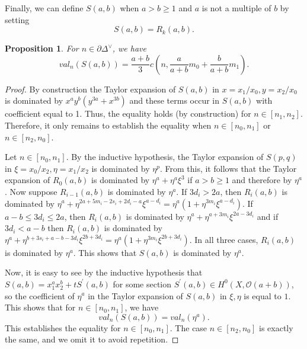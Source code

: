 \documentclass{article}
\newtheorem{prop}{Proposition}
\begin{document}
Finally, we can define $S(a,b)$ when $a>b\geq1$ and $a$ is not a multiple of $b$ by setting 
\[
S(a,b) = R_k(a,b).
\]

\begin{prop}
     For $n \in \partial\Delta^\vee$, we have 
    \[
    val_n(S(a,b)) = \frac{a+b}{3}c(n,\frac{a}{a+b}m_0+\frac{b}{a+b}m_1 ).
    \]
\end{prop}
\begin{proof}
    By construction the Taylor expansion of $S(a,b)$ in $x=x_1/x_0, y = x_2/x_0$ is dominated by $x^ay^b(y^{3a}+x^{3b})$ and these terms occur in $S(a,b)$ with coefficient equal to 1. Thus, the equality holds (by construction) for $n\in [n_1,n_2]$. Therefore, it only remains to establish the equality when $n\in [n_0,n_1]$ or $n\in[n_2,n_0]$. 
    
    Let $n\in[n_0,n_1]$. By the inductive hypothesis, the Taylor expansion of $S(p,q)$ in $\xi=x_0/x_2, \eta = x_1/x_2$ is dominated by $\eta^p$. From this, it follows that the Taylor expansion of $R_0(a,b)$ is dominated by $\eta^a+\eta^{a}\xi^3$ if $a>b \geq 1$ and therefore by $\eta^a$. Now suppose $R_{i-1}(a,b)$ is dominated by $\eta^a$. If $3d_i>2a$, then $R_i(a,b)$ is dominated by $\eta^a + \eta^{2a+5m_i-2s_i+2d_i-a}\xi^{a-d_i} = \eta^a(1+\eta^{3m_i}\xi^{a-d_i})$. If $a-b
    \leq 3d_i\leq 2a$, then $R_i(a,b)$ is dominated by $\eta^a+\eta^{a+3m_i}\xi^{2a-3d_i}$ and if $3d_i<a-b$ then $R_i(a,b)$ is dominated by $\eta^a+\eta^{b+3s_i+a-b-3d_i}\xi^{2b+3d_i}=\eta^{a}(1+\eta^{3m_i}\xi^{2b+3d_i})$. In all three cases, $R_i(a,b)$ is dominated by $\eta^a$. This shows that $S(a,b)$ is dominated by $\eta^a$. 
    
    Now, it is easy to see by the inductive hypothesis that $S(a,b) = x_1^ax_2^b+tS^\prime(a,b)$ for some section $S^\prime (a,b) \in H^0(X,\mathcal O(a+b))$, so the coefficient of $\eta^a$ in the Taylor expansion of $S(a,b)$ in $\xi,\eta$ is equal to $1$. This shows that for $n\in[n_0,n_1]$, we have 
    \[
    val_n(S(a,b))= val_n(\eta^a).
    \]
    This establishes the equality for $n\in[n_0,n_1]$. The case $n\in[n_2,n_0]$ is exactly the same, and we omit it to avoid repetition.
\end{proof}
\end{document}
